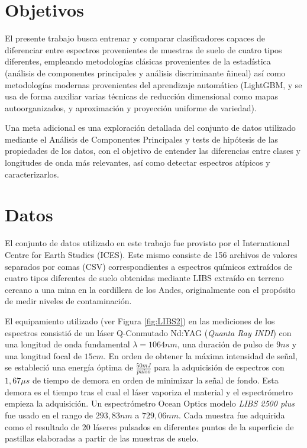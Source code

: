 \documentclass[12pt]{article}
\begin{document}
\section{Objetivos}

El presente trabajo busca entrenar y comparar clasificadores capaces de diferenciar entre espectros provenientes de muestras de suelo de cuatro tipos diferentes, empleando metodologías clásicas provenientes de la estadística (análisis de componentes principales y análisis discriminante ñineal) así como metodologías modernas provenientes del aprendizaje automático (LightGBM, y se usa de forma auxiliar varias técnicas de reducción dimensional como mapas autoorganizados, y aproximación y proyección uniforme de variedad).

Una meta adicional es una exploración detallada del conjunto de datos utilizado mediante el Análisis de Componentes Principales y tests de hipótesis de las propiedades de los datos, con el objetivo de entender las diferencias entre clases y longitudes de onda más relevantes, así como detectar espectros atípicos y caracterizarlos.

\section{Datos}

El conjunto de datos utilizado en este trabajo fue provisto por el International Centre for Earth Studies (ICES). Este mismo consiste de 156 archivos de valores separados por comas (CSV) correspondientes a espectros químicos extraídos de cuatro tipos diferentes de suelo obtenidas mediante LIBS extraído en terreno cercano a una mina en la cordillera de los Andes, originalmente con el propósito de medir niveles de contaminación. 

El equipamiento utilizado (ver Figura \ref{fig:LIBS2}) en las mediciones de los espectros consistió de un láser Q-Conmutado Nd:YAG (\textit{Quanta Ray INDI}) con una longitud de onda fundamental $\lambda = 1064nm$, una duración de pulso de $9ns$ y una longitud focal de $15cm$. En orden de obtener la máxima intensidad de señal, se estableció una energía óptima de $\frac{50mJ}{pulso}$ para la adquicisión de espectros con $1,67\mu s$ de tiempo de demora en orden de minimizar la señal de fondo. Esta demora es el tiempo tras el cual el láser vaporiza el material y el espectrómetro empieza la adquisición. Un espectrómetro Ocean Optics modelo \textit{LIBS 2500 plus} fue usado en el rango de $293,83nm$ a $729,06nm$. Cada muestra fue adquirida como el resultado de 20 láseres pulsados en diferentes puntos de la superficie de pastillas elaboradas a partir de las muestras de suelo.
\end{document}
